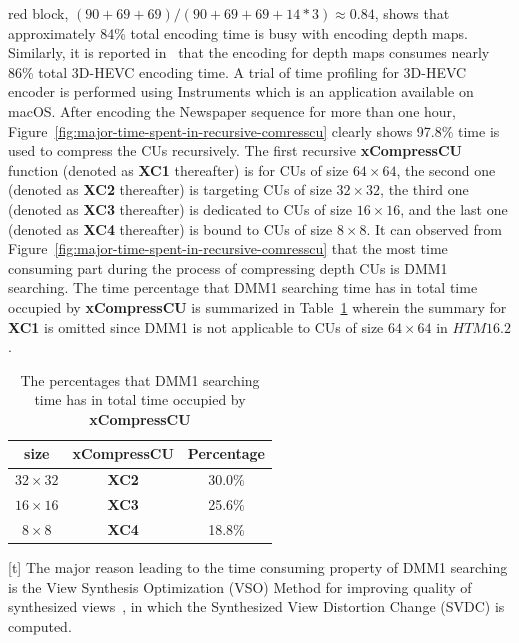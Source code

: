 red block, \((90+69+69)/(90+69+69+14*3) \approx 0.84\), shows that
approximately 84\% total encoding time is busy with encoding
depth maps.
Similarly, it is reported in~\parencite{RN111} that the 
encoding for depth maps
consumes nearly 86\% total 3D-HEVC encoding time.
A trial of time profiling for 3D-HEVC encoder is performed using Instruments
which is an application available on macOS\@.
After encoding the Newspaper sequence for more than one hour,
Figure~\ref{fig:major-time-spent-in-recursive-comresscu} clearly shows
97.8\% time is used to compress the CUs recursively.
The first recursive \textbf{xCompressCU} function 
(denoted as \textbf{XC1} thereafter) is
for CUs of size \(64\times64\), 
the second one
(denoted as \textbf{XC2} thereafter) is targeting 
CUs of size \(32\times32\),
the third one (denoted as \textbf{XC3} thereafter) is dedicated
to CUs of size \(16\times16\), 
and the last one 
(denoted as \textbf{XC4} thereafter) is bound
to CUs of size \(8\times8\).
It can observed from 
Figure~\ref{fig:major-time-spent-in-recursive-comresscu} 
that the most time consuming part
during the process of
compressing depth CUs is DMM1 searching.
The time percentage that DMM1 searching time has in total time occupied 
by \textbf{xCompressCU} is summarized in
Table~\ref{tab:dmm1-searching-time-percent-summary} wherein the summary
for \textbf{XC1} is omitted since DMM1 is not 
applicable to CUs of size \(64\times64\) in
\(HTM16.2\).
\begin{table}[t]
    \caption{The percentages that DMM1 searching time has in total time occupied 
    by \textbf{xCompressCU}}
    \bigskip\label{tab:dmm1-searching-time-percent-summary}
    \centering
    \begin{tabular}{c c c}
        \toprule
        size & xCompressCU & Percentage\\
        \midrule
        \(32\times32\)  & \textbf{XC2} & 30.0\% \\
        \(16\times16\) & \textbf{XC3} & 25.6\% \\
        \(8\times8\) & \textbf{XC4} & 18.8\% \\
        \bottomrule
    \end{tabular}
\end{table}[t]
The major reason leading to the time consuming property of DMM1 searching is the
View Synthesis Optimization (VSO) Method for improving quality of
synthesized views~\parencite{RN124}, in which the Synthesized View Distortion
Change (SVDC) is computed.
